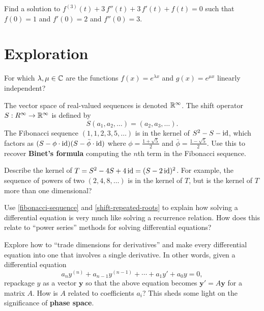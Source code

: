 \documentclass{homework}
\begin{document}
\begin{problem}
  Find a solution to $f^{(3)}(t) + 3 \, f''(t) + 3 \, f'(t) + f(t) = 0$ such that $f(0) = 1$ and $f'(0) = 2$ and $f''(0) = 3$.
\end{problem}

\section{Exploration}

\begin{problem}
  For which $\lambda, \mu \in \mathbb{C}$ are the functions $f(x) = e^{\lambda x}$ and $g(x) = e^{\mu x}$ linearly independent?
\end{problem}

\begin{problem}\label{fibonacci-sequence}The vector space of real-valued sequences is denoted $\mathbb{R}^\infty$.
  The shift operator $S : R^\infty \to \mathbb{R}^\infty$ is defined by
  \[
    S(a_1,a_2,\ldots) = (a_2,a_3,\ldots).
  \]
  The Fibonacci sequence $(1,1,2,3,5,\ldots)$ is in the kernel of $S^2 - S - \operatorname{id}$, which factors as $(S- \phi \cdot \operatorname{id})(S - \bar{\phi} \cdot \operatorname{id})$ where $\phi = \frac{1+\sqrt{5}}{2}$ and $\bar{\phi} = \frac{1-\sqrt{5}}{2}$.  Use this to recover \textbf{Binet's formula} computing the $n$th term in the Fibonacci sequence.  
\end{problem}

\begin{problem}\label{shift-repeated-roots}Describe the kernel of $T = S^2 - 4S + 4\operatorname{id} = (S-2\operatorname{id})^2$.  For
  example, the sequence of powers of two $(2,4,8,\ldots)$ is in the
  kernel of $T$, but is the kernel of $T$ more than one dimensional?
\end{problem}

\begin{problem}
  Use \ref{fibonacci-sequence} and \ref{shift-repeated-roots} to
  explain how solving a differential equation is very much like
  solving a recurrence relation.  How does this relate to ``power
  series'' methods for solving differential equations?
\end{problem}

\begin{problem}\label{introduction-phase-space}Explore how to ``trade dimensions for derivatives'' and make every differential equation into one that involves a single derivative.  In other words, given a differential equation
  \[
    a_n y^{(n)} + a_{n-1} y^{(n-1)} + \cdots + a_1 y' + a_0 y  = 0,
  \]
  repackage $y$ as a vector $\textbf{y}$ so that the above equation becomes $\textbf{y}' = A \textbf{y}$ for a matrix $A$.  How is $A$ related to coefficients $a_i$?  This sheds some light on the significance of \textbf{phase space}.
\end{problem}
\end{document}
